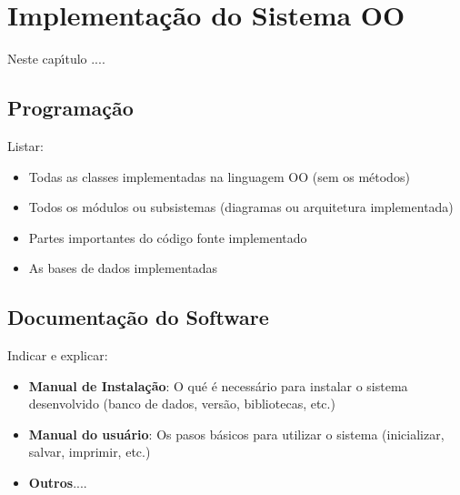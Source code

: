 
\chapter{Implementa\c{c}\~{a}o do Sistema OO}

Neste cap\'{\i}tulo ....

   \section{Programa\c{c}\~{a}o}
   Listar:
   \begin{itemize}
     \item Todas as classes implementadas na linguagem OO (sem os m\'{e}todos)
     \item Todos os m\'{o}dulos ou subsistemas (diagramas ou arquitetura implementada)
     \item Partes importantes do c\'{o}digo fonte implementado
     \item As bases de dados implementadas
   \end{itemize}


   \section{Documenta\c{c}\~{a}o do Software}

   Indicar e explicar:
   \begin{itemize}
     \item \textbf{Manual de Instala\c{c}\~{a}o}: O qu\'{e} \'{e} necess\'{a}rio para instalar o sistema desenvolvido (banco de dados, vers\~{a}o, bibliotecas, etc.)
     \item \textbf{Manual do usu\'{a}rio}: Os pasos b\'{a}sicos para utilizar o sistema (inicializar, salvar, imprimir, etc.)
     \item \textbf{Outros}....
   \end{itemize}







